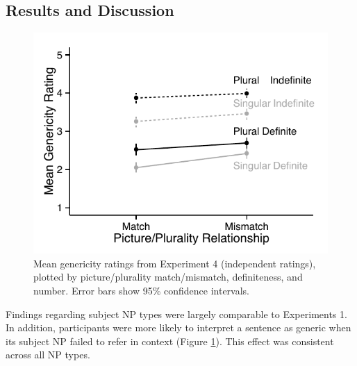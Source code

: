 \documentclass[10pt,letterpaper]{article}
\begin{document}

\subsection{Results and Discussion}


\begin{figure}[t]
\centering
\includegraphics[width=.9\linewidth]{figures/e2b_mod.pdf}
\caption{\label{fig:e2b} Mean genericity ratings from Experiment 4 (independent ratings), plotted by picture/plurality match/mismatch, definiteness, and number. Error bars show 95\% confidence intervals.} 
\end{figure}

Findings regarding subject NP types were largely comparable to Experiments 1. In addition, participants were more likely to interpret a sentence as generic when its subject NP failed to refer in context (Figure \ref{fig:e2b}). This effect was consistent across all NP types. 
\end{document}
